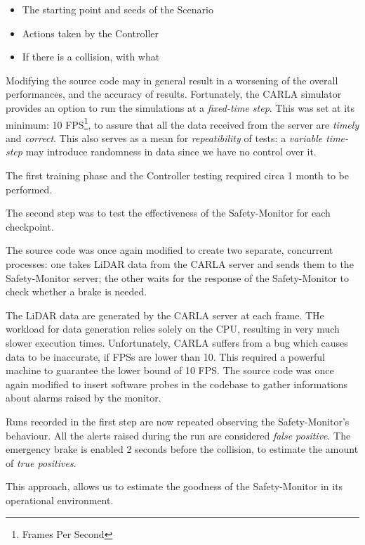 \begin{itemize}
	\item The starting point and seeds of the Scenario
	\item Actions taken by the Controller
	\item If there is a collision, with what
\end{itemize}

Modifying the source code may in general result in a worsening of the overall performances, and the accuracy of results. Fortunately, the CARLA simulator provides an option to run the simulations at a \textsl{fixed-time step}. This was set at its minimum: 10 FPS\footnote{Frames Per Second}, to assure that all the data received from the server are \textsl{timely} and \textsl{correct}. This also serves as a mean for \textsl{repeatibility} of tests: a \textsl{variable time-step} may introduce randomness in data since we have no control over it.

The first training phase and the Controller testing required circa 1 month to be performed.\newline

The second step was to test the effectiveness of the Safety-Monitor for each checkpoint.

The source code was once again modified to create two separate, concurrent processes: one takes LiDAR data from the CARLA server and sends them to the Safety-Monitor server; the other waits for the response of the Safety-Monitor to check whether a brake is needed.

The LiDAR data are generated by the CARLA server at each frame. THe workload for data generation relies solely on the CPU, resulting in very much slower execution times. Unfortunately, CARLA suffers from a bug which causes data to be inaccurate, if FPSs are lower than 10. This required a powerful machine to guarantee the lower bound of 10 FPS.
The source code was once again modified to insert software probes in the codebase to gather informations about alarms raised by the monitor.

Runs recorded in the first step are now repeated observing the Safety-Monitor's behaviour. All the alerts raised during the run are considered \textsl{false positive}. The emergency brake is enabled 2 seconds before the collision, to estimate the amount of \textsl{true positives}.

This approach, allows us to estimate the goodness of the Safety-Monitor in its operational environment.\newline

